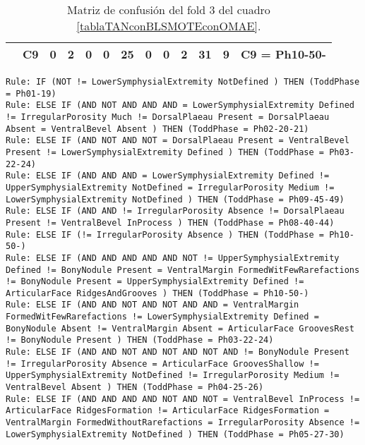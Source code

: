 \begin{table}[H]
{\begin{tabular}{|ccrrrrrrrrrrc|}
\multicolumn{1}{|c|}{}                                      & \multicolumn{1}{c|}{C9} & \multicolumn{1}{c|}{0}  & \multicolumn{1}{c|}{\textbf{2}}  & \multicolumn{1}{c|}{0}  & \multicolumn{1}{c|}{0}  & \multicolumn{1}{c|}{\textbf{25}} & \multicolumn{1}{c|}{0}  & \multicolumn{1}{c|}{0}  & \multicolumn{1}{c|}{\textbf{2}}  & \multicolumn{1}{c|}{\textbf{31}} & \multicolumn{1}{c|}{\textbf{9}}  & C9 = Ph10-50-     \\ \hline
\end{tabular}%
}
\caption{Matriz de confusión del fold 3 del cuadro \ref{tablaTANconBLSMOTEconOMAE}.}

\end{table}

\begin{lstlisting}
Rule: IF (NOT != LowerSymphysialExtremity NotDefined ) THEN (ToddPhase = Ph01-19)
Rule: ELSE IF (AND NOT AND AND AND = LowerSymphysialExtremity Defined != IrregularPorosity Much != DorsalPlaeau Present = DorsalPlaeau Absent = VentralBevel Absent ) THEN (ToddPhase = Ph02-20-21)
Rule: ELSE IF (AND NOT AND NOT = DorsalPlaeau Present = VentralBevel Present != LowerSymphysialExtremity Defined ) THEN (ToddPhase = Ph03-22-24)
Rule: ELSE IF (AND AND AND = LowerSymphysialExtremity Defined != UpperSymphysialExtremity NotDefined = IrregularPorosity Medium != LowerSymphysialExtremity NotDefined ) THEN (ToddPhase = Ph09-45-49)
Rule: ELSE IF (AND AND != IrregularPorosity Absence != DorsalPlaeau Present != VentralBevel InProcess ) THEN (ToddPhase = Ph08-40-44)
Rule: ELSE IF (!= IrregularPorosity Absence ) THEN (ToddPhase = Ph10-50-)
Rule: ELSE IF (AND AND AND AND AND NOT != UpperSymphysialExtremity Defined != BonyNodule Present = VentralMargin FormedWitFewRarefactions != BonyNodule Present = UpperSymphysialExtremity Defined != ArticularFace RidgesAndGrooves ) THEN (ToddPhase = Ph10-50-)
Rule: ELSE IF (AND AND NOT AND NOT AND AND = VentralMargin FormedWitFewRarefactions != LowerSymphysialExtremity Defined = BonyNodule Absent != VentralMargin Absent = ArticularFace GroovesRest != BonyNodule Present ) THEN (ToddPhase = Ph03-22-24)
Rule: ELSE IF (AND AND NOT AND NOT AND NOT AND != BonyNodule Present != IrregularPorosity Absence = ArticularFace GroovesShallow != UpperSymphysialExtremity NotDefined != IrregularPorosity Medium != VentralBevel Absent ) THEN (ToddPhase = Ph04-25-26)
Rule: ELSE IF (AND AND AND AND NOT AND NOT = VentralBevel InProcess != ArticularFace RidgesFormation != ArticularFace RidgesFormation = VentralMargin FormedWithoutRarefactions = IrregularPorosity Absence != LowerSymphysialExtremity NotDefined ) THEN (ToddPhase = Ph05-27-30)

\end{lstlisting}
